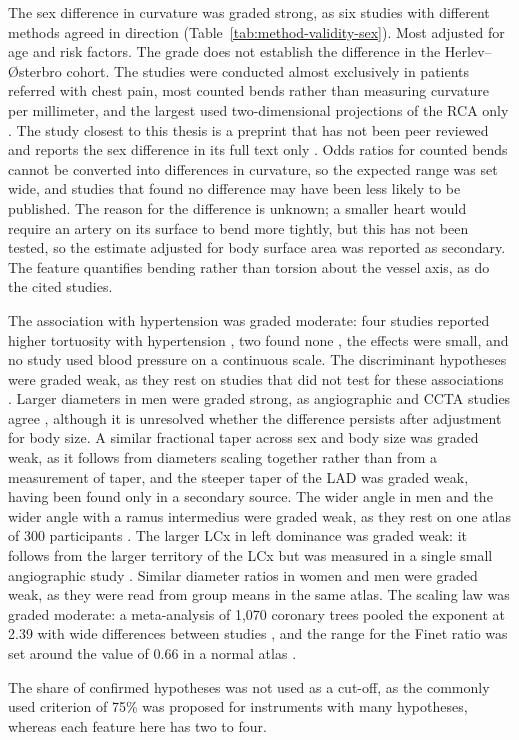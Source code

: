 The sex difference in curvature was graded strong, as six studies with different methods agreed in direction (Table~\ref{tab:method-validity-sex}).
Most adjusted for age and risk factors.
The grade does not establish the difference in the Herlev--{\O}sterbro cohort.
The studies were conducted almost exclusively in patients referred with chest pain, most counted bends rather than measuring curvature per millimeter, and the largest used two-dimensional projections of the RCA only \cite{telloayala2026tortuosity}.
The study closest to this thesis is a preprint that has not been peer reviewed and reports the sex difference in its full text only \cite{gharleghi2024leftmain}.
Odds ratios for counted bends cannot be converted into differences in curvature, so the expected range was set wide, and studies that found no difference may have been less likely to be published.
The reason for the difference is unknown; a smaller heart would require an artery on its surface to bend more tightly, but this has not been tested, so the estimate adjusted for body surface area was reported as secondary.
The feature quantifies bending rather than torsion about the vessel axis, as do the cited studies.

The association with hypertension was graded moderate: four studies reported higher tortuosity with hypertension \cite{li2011tortuosity, li2022tortuosity, telloayala2026tortuosity, sharfo2024tortuosity}, two found none \cite{groves2009tortuosity, gharleghi2024leftmain}, the effects were small, and no study used blood pressure on a continuous scale.
The discriminant hypotheses were graded weak, as they rest on studies that did not test for these associations \cite{groves2009tortuosity}.
Larger diameters in men were graded strong, as angiographic and CCTA studies agree \cite{dodge1992diameter, medranogracia2016atlas, gharleghi2024leftmain}, although it is unresolved whether the difference persists after adjustment for body size.
A similar fractional taper across sex and body size was graded weak, as it follows from diameters scaling together rather than from a measurement of taper, and the steeper taper of the LAD was graded weak, having been found only in a secondary source.
The wider angle in men and the wider angle with a ramus intermedius were graded weak, as they rest on one atlas of 300 participants \cite{medranogracia2016atlas}.
The larger LCx in left dominance was graded weak: it follows from the larger territory of the LCx but was measured in a single small angiographic study \cite{dodge1992diameter}.
Similar diameter ratios in women and men were graded weak, as they were read from group means in the same atlas.
The scaling law was graded moderate: a meta-analysis of 1,070 coronary trees pooled the exponent at 2.39 with wide differences between studies \cite{taylor2024murray}, and the range for the Finet ratio was set around the value of 0.66 in a normal atlas \cite{medranogracia2016atlas}.

The share of confirmed hypotheses was not used as a cut-off, as the commonly used criterion of 75\% \cite{terwee2007quality, prinsen2018cosmin} was proposed for instruments with many hypotheses, whereas each feature here has two to four.
